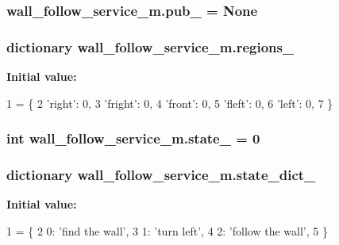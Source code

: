 \subsubsection[{\texorpdfstring{pub\+\_\+}{pub_}}]{\setlength{\rightskip}{0pt plus 5cm}wall\+\_\+follow\+\_\+service\+\_\+m.\+pub\+\_\+ = None}\hypertarget{namespacewall__follow__service__m_aa66ff19a5a11afad8ec15143f733bea2}{}\label{namespacewall__follow__service__m_aa66ff19a5a11afad8ec15143f733bea2}
\subsubsection[{\texorpdfstring{regions\+\_\+}{regions_}}]{\setlength{\rightskip}{0pt plus 5cm}dictionary wall\+\_\+follow\+\_\+service\+\_\+m.\+regions\+\_\+}\hypertarget{namespacewall__follow__service__m_a30a3b79a68496f06646ee64d67423f36}{}\label{namespacewall__follow__service__m_a30a3b79a68496f06646ee64d67423f36}
{\bfseries Initial value\+:}
\begin{DoxyCode}
1 = \{
2     \textcolor{stringliteral}{'right'}: 0,
3     \textcolor{stringliteral}{'fright'}: 0,
4     \textcolor{stringliteral}{'front'}: 0,
5     \textcolor{stringliteral}{'fleft'}: 0,
6     \textcolor{stringliteral}{'left'}: 0,
7 \}
\end{DoxyCode}
\subsubsection[{\texorpdfstring{state\+\_\+}{state_}}]{\setlength{\rightskip}{0pt plus 5cm}int wall\+\_\+follow\+\_\+service\+\_\+m.\+state\+\_\+ = 0}\hypertarget{namespacewall__follow__service__m_a1f1e8197a7b86b64c5c2c256173e371d}{}\label{namespacewall__follow__service__m_a1f1e8197a7b86b64c5c2c256173e371d}
\subsubsection[{\texorpdfstring{state\+\_\+dict\+\_\+}{state_dict_}}]{\setlength{\rightskip}{0pt plus 5cm}dictionary wall\+\_\+follow\+\_\+service\+\_\+m.\+state\+\_\+dict\+\_\+}\hypertarget{namespacewall__follow__service__m_a723d03e512b26cc484d9299418b2773d}{}\label{namespacewall__follow__service__m_a723d03e512b26cc484d9299418b2773d}
{\bfseries Initial value\+:}
\begin{DoxyCode}
1 = \{
2     0: \textcolor{stringliteral}{'find the wall'},
3     1: \textcolor{stringliteral}{'turn left'},
4     2: \textcolor{stringliteral}{'follow the wall'},
5 \}
\end{DoxyCode}
